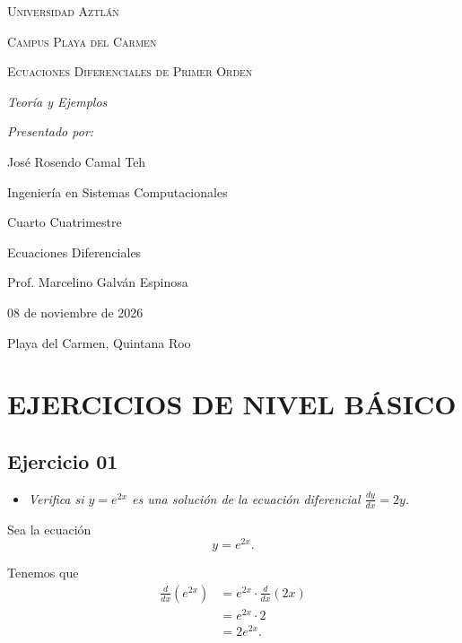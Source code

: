 \documentclass[12pt]{article}
\begin{document}
\begin{titlepage}
	\centering
	{\scshape\LARGE Universidad Aztlán \par}
	\vspace{1cm}
	{\scshape\Large Campus Playa del Carmen \par}
	\vspace{1.75cm}
	{\scshape\Huge Ecuaciones Diferenciales de Primer Orden \par}
    \vfill
    {\itshape\Large Teoría y Ejemplos \par}
	\vspace{2cm}
    {\itshape\Large Presentado por: \par}
	{\Large José Rosendo Camal Teh \par}
	\vfill
	{\Large Ingeniería en Sistemas Computacionales \par}
	{\Large Cuarto Cuatrimestre \par}
	{\Large Ecuaciones Diferenciales \par}
	\vfill
	{\Large Prof. Marcelino Galván Espinosa \par}
	\vfill
	{\Large 08 de noviembre de 2026 \par}
	\vfill
	{\Large Playa del Carmen, Quintana Roo \par}
\end{titlepage}
\newpage

\tableofcontents
\newpage 

\section*{ EJERCICIOS DE NIVEL BÁSICO }

\subsection*{\centering Ejercicio 01 }

\begin{itemize}
    \item \emph{Verifica si \(y = e^{2x}\) es una solución de la ecuación diferencial \(\frac{dy}{dx} = 2y\).}
\end{itemize}

Sea la ecuación
\[ y = e^{2x}. \]

Tenemos que
\begin{align*}
    \frac{d}{dx}\left( e^{2x} \right) &= e^{2x} \cdot \frac{d}{dx}\left( 2x \right) \\
    &= e^{2x} \cdot 2 \\
    &= 2e^{2x}.
\end{align*}
\end{document}
